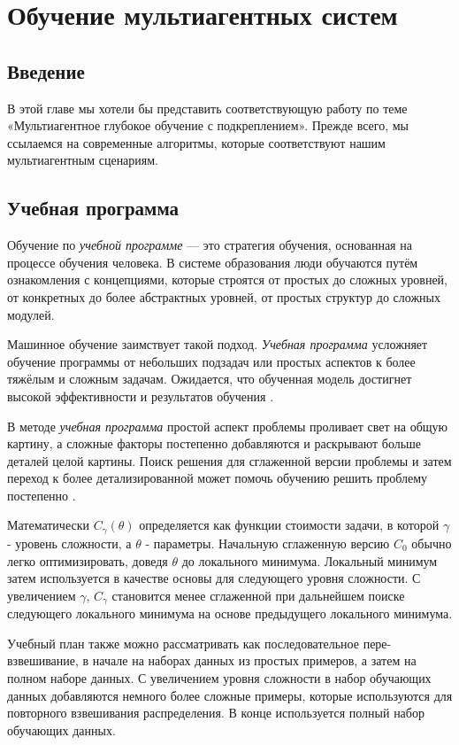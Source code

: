 \chapter{Обучение мультиагентных систем} \label{ch2}

\section{Введение} \label{ch2:intro}

В этой главе мы хотели бы представить соответствующую работу по теме «Мультиагентное глубокое обучение с подкреплением». Прежде всего, мы ссылаемся на современные алгоритмы, которые соответствуют нашим мультиагентным сценариям.




\section{Учебная программа}

Обучение по \textit{учебной программе} — это стратегия обучения, основанная на процессе обучения человека. В системе образования люди обучаются путём ознакомления с концепциями, которые строятся от простых до сложных уровней, от конкретных до более абстрактных уровней, от простых структур до сложных модулей.

Машинное обучение заимствует такой подход. \textit{Учебная программа} усложняет обучение программы от небольших подзадач или простых аспектов к более тяжёлым и сложным задачам. Ожидается, что обученная модель достигнет высокой эффективности и результатов обучения \cite{10.5555/3171837.3172051}.

В методе \textit{учебная программа} простой аспект проблемы проливает свет на общую картину, а сложные факторы постепенно добавляются и раскрывают больше деталей целой картины. Поиск решения для сглаженной версии проблемы и затем переход к более детализированной может помочь обучению решить проблему постепенно \cite{graves2017automated}.

Математически $C_\gamma (\theta)$ определяется как функции стоимости задачи, в которой $\gamma$ - уровень сложности, а $\theta$ - параметры. Начальную сглаженную версию $C_0$ обычно легко оптимизировать, доведя $\theta$ до локального минимума. Локальный минимум затем используется в качестве основы для следующего уровня сложности. С увеличением $\gamma$, $C_\gamma$ становится менее сглаженной при дальнейшем поиске следующего локального минимума на основе предыдущего локального минимума. \cite{10.1145/1553374.1553380}

Учебный план также можно рассматривать как последовательное пере-взвешивание, в начале на наборах данных из простых примеров, а затем на полном наборе данных. С увеличением уровня сложности в набор обучающих данных добавляются немного более сложные примеры, которые используются для повторного взвешивания распределения. В конце используется полный набор обучающих данных. \cite{10.1145/1553374.1553380}

\newpage %
